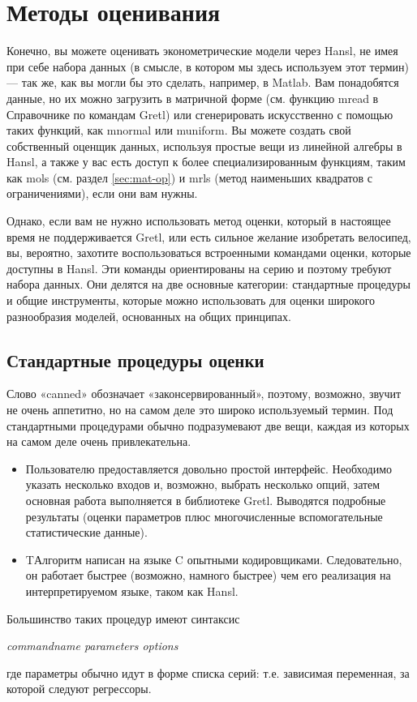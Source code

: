 \chapter{Методы оценивания}
\label{chap:estimation}

Конечно, вы можете оценивать эконометрические модели через Hansl, не
имея при себе набора данных (в смысле, в котором мы здесь используем
этот термин) --- так же, как вы могли бы это сделать, например, в
\textsf{Matlab}. Вам понадобятся данные, но их можно загрузить в
матричной форме (см. функцию mread в Справочнике по командам Gretl)
или сгенерировать искусственно с помощью таких функций, как mnormal
или muniform. Вы можете создать свой собственный оценщик данных,
используя простые вещи из линейной алгебры в Hansl, а также у вас есть
доступ к более специализированным функциям, таким как mols (см. раздел
\ref{sec:mat-op}) и mrls (метод наименьших квадратов с ограничениями),
если они вам нужны.

Однако, если вам не нужно использовать метод оценки, который в
настоящее время не поддерживается Gretl, или есть сильное желание
изобретать велосипед, вы, вероятно, захотите воспользоваться
встроенными командами оценки, которые доступны в Hansl. Эти команды
ориентированы на серию и поэтому требуют набора данных. Они делятся на
две основные категории: стандартные процедуры и общие инструменты,
которые можно использовать для оценки широкого разнообразия моделей,
основанных на общих принципах.

\section{Стандартные процедуры оценки}
\label{sec:canned}

Слово «canned» обозначает «законсервированный», поэтому, возможно,
звучит не очень аппетитно, но на самом деле это широко используемый
термин. Под стандартными процедурами обычно подразумевают две вещи,
каждая из которых на самом деле очень привлекательна.
\begin{itemize}
\item Пользователю предоставляется довольно простой
  интерфейс. Необходимо указать несколько входов и, возможно, выбрать
  несколько опций, затем основная работа выполняется в библиотеке
  Gretl. Выводятся подробные результаты (оценки параметров плюс
  многочисленные вспомогательные статистические данные).
\item TАлгоритм написан на языке C опытными
  кодировщиками. Следовательно, он работает быстрее (возможно, намного
  быстрее) чем его реализация на интерпретируемом языке, таком как
  Hansl.
\end{itemize}
Большинство таких процедур имеют синтаксис 
\begin{flushleft}
\quad \textsl{commandname parameters options}
\end{flushleft}
где параметры обычно идут в форме списка серий: т.е. зависимая
переменная, за которой следуют регрессоры.


